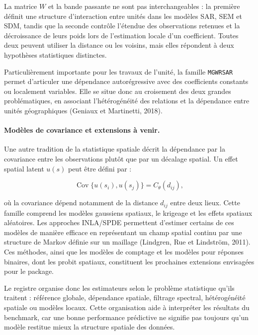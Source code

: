 \documentclass[11pt,a4paper]{article}
\begin{document}
La matrice $W$ et la bande passante ne sont pas interchangeables : la première définit une structure d'interaction entre unités dans les modèles SAR, SEM et SDM, tandis que la seconde contrôle l'étendue des observations retenues et la décroissance de leurs poids lors de l'estimation locale d'un coefficient. Toutes deux peuvent utiliser la distance ou les voisins, mais elles répondent à deux hypothèses statistiques distinctes.

Particulièrement importante pour les travaux de l'unité, la famille \texttt{MGWRSAR} permet d'articuler une dépendance autorégressive avec des coefficients constants ou localement variables. Elle se situe donc au croisement des deux grandes problématiques, en associant l'hétérogénéité des relations et la dépendance entre unités géographiques (Geniaux et Martinetti, 2018).

\paragraph{Modèles de covariance et extensions à venir.}

Une autre tradition de la statistique spatiale décrit la dépendance par la covariance entre les observations plutôt que par un décalage spatial. Un effet spatial latent $u(s)$ peut être défini par :

\begin{equation}
    \operatorname{Cov}\{u(s_i),u(s_j)\}=C_{\theta}(d_{ij}),
\end{equation}

où la covariance dépend notamment de la distance $d_{ij}$ entre deux lieux. Cette famille comprend les modèles gaussiens spatiaux, le krigeage et les effets spatiaux aléatoires. Les approches INLA/SPDE permettent d'estimer certains de ces modèles de manière efficace en représentant un champ spatial continu par une structure de Markov définie sur un maillage (Lindgren, Rue et Lindström, 2011). Ces méthodes, ainsi que les modèles de comptage et les modèles pour réponses binaires, dont les probit spatiaux, constituent les prochaines extensions envisagées pour le package.

Le registre organise donc les estimateurs selon le problème statistique qu'ils traitent : référence globale, dépendance spatiale, filtrage spectral, hétérogénéité spatiale ou modèles locaux. Cette organisation aide à interpréter les résultats du benchmark, car une bonne performance prédictive ne signifie pas toujours qu'un modèle restitue mieux la structure spatiale des données.
\end{document}
